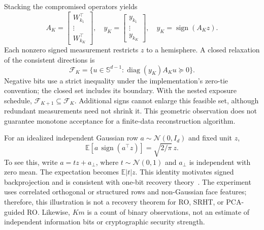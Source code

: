 Stacking the compromised operators yields
\begin{equation}
 A_K=\begin{bmatrix}W_{k_1}^\top\\\vdots\\W_{k_K}^\top\end{bmatrix},
 \quad y_K=\begin{bmatrix}y_{k_1}\\\vdots\\y_{k_K}\end{bmatrix},
 \quad y_K=\operatorname{sign}(A_Kz).
\end{equation}
Each nonzero signed measurement restricts $z$ to a hemisphere. A closed relaxation of the consistent directions is
\begin{equation}
 \mathcal F_K=\{u\in\mathbb S^{d-1}:\operatorname{diag}(y_K)A_Ku\succeq0\}.
\label{eq:feasible}
\end{equation}
Negative bits use a strict inequality under the implementation's zero-tie convention; the closed set includes its boundary. With the nested exposure schedule, $\mathcal F_{K+1}\subseteq\mathcal F_K$. Additional signs cannot enlarge this feasible set, although redundant measurements need not shrink it. This geometric observation does not guarantee monotone acceptance for a finite-data reconstruction algorithm.

For an idealized independent Gaussian row $a\sim\mathcal N(0,I_d)$ and fixed unit $z$,
\begin{equation}
 \mathbb E[a\,\operatorname{sign}(a^\top z)]=\sqrt{2/\pi}\,z.
\label{eq:gaussian}
\end{equation}
To see this, write $a=tz+a_\perp$, where $t\sim\mathcal N(0,1)$ and $a_\perp$ is independent with zero mean. The expectation becomes $\mathbb E|t|z$. This identity motivates signed backprojection and is consistent with one-bit recovery theory~\cite{plan2013,jacques2013}. The experiment uses correlated orthogonal or structured rows and non-Gaussian face features; therefore, this illustration is not a recovery theorem for RO, SRHT, or PCA-guided RO. Likewise, $Km$ is a count of binary observations, not an estimate of independent information bits or cryptographic security strength.


